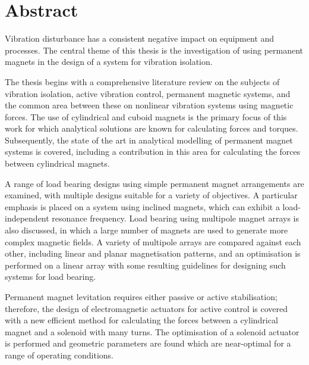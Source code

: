 \documentclass[10pt,a4paper]{memoir}
\def\standaloneabstract{}
\begin{document}
\ifx\standaloneabstract\undefined

  \section*{Abstract}

\else



  \bigskip
  
  \expandafter\noindent
\fi
Vibration disturbance has a consistent negative impact on equipment and processes.
The central theme of this thesis is the investigation of using permanent magnets in the design of a system for vibration isolation.

The thesis begins with a comprehensive literature review on the subjects of vibration isolation, active vibration control, permanent magnetic systems, and the common area between these on nonlinear vibration systems using magnetic forces.
The use of cylindrical and cuboid magnets is the primary focus of this work for which analytical solutions are known for calculating forces and torques.
Subsequently, the state of the art in analytical modelling of permanent magnet systems is covered, including a contribution in this area for calculating the forces between cylindrical magnets.

A range of load bearing designs using simple permanent magnet arrangements are examined, with multiple designs suitable for a variety of objectives.
A particular emphasis is placed on a system using inclined magnets, which can exhibit a load-independent resonance frequency.
Load bearing using multipole magnet arrays is also discussed, in which a large number of magnets are used to generate more complex magnetic fields.
A variety of multipole arrays are compared against each other, including linear and planar magnetisation patterns, and an optimisation is performed on a linear array with some resulting guidelines for designing such systems for load bearing.

Permanent magnet levitation requires either passive or active stabilisation; therefore, the design of electromagnetic actuators for active control is covered with a new efficient method for calculating the forces between a cylindrical magnet and a solenoid with many turns.
The optimisation of a solenoid actuator is performed and geometric parameters are found which are near-optimal for a range of operating conditions.
\end{document}
